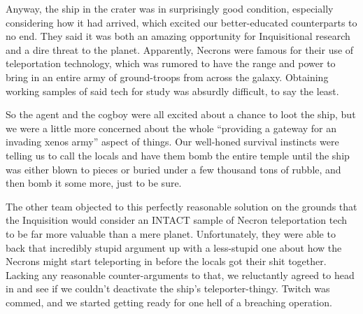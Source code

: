 Anyway, the ship in the crater was in surprisingly good condition, especially considering how it had arrived, which excited our better-educated counterparts to no end. 
They said it was both an amazing opportunity for Inquisitional research and a dire threat to the planet. 
Apparently, Necrons were famous for their use of teleportation technology, which was rumored to have the range and power to bring in an entire army of ground-troops from across the galaxy. 
Obtaining working samples of said tech for study was absurdly difficult, to say the least. 


So the agent and the cogboy were all excited about a chance to loot the ship, but we were a little more concerned about the whole “providing a gateway for an invading xenos army” aspect of things. 
Our well-honed survival instincts were telling us to call the locals and have them bomb the entire temple until the ship was either blown to pieces or buried under a few thousand tons of rubble, and then bomb it some more, just to be sure. 


The other team objected to this perfectly reasonable solution on the grounds that the Inquisition would consider an INTACT sample of Necron teleportation tech to be far more valuable than a mere planet. 
Unfortunately, they were able to back that incredibly stupid argument up with a less-stupid one about how the Necrons might start teleporting in before the locals got their shit together. 
Lacking any reasonable counter-arguments to that, we reluctantly agreed to head in and see if we couldn’t deactivate the ship’s teleporter-thingy. 
Twitch was commed, and we started getting ready for one hell of a breaching operation.

